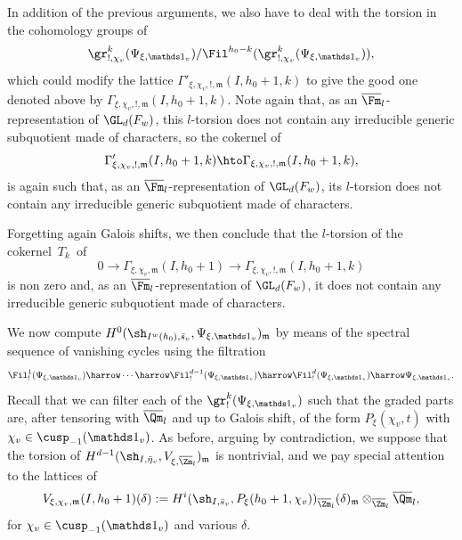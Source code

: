 In addition of the previous arguments, we also have to deal with the
torsion in the cohomology groups of
\[
\gr^{k}_{!,\chi_v}(\Psi_{\xi,\mathds 1_v}) /\Fil^{h_0-k}(\gr^{k}_{!,\chi_v}
(\Psi_{\xi,\mathds 1_v})),
\]
which could modify the lattice $\Gamma'_{\xi,\chi_v,!,\mathfrak m}
(I,h_0+1,k)$ to give the good one denoted above by
$\Gamma_{\xi,\chi_v,!,\mathfrak m}(I,h_0+1,k)$. Note
again that,
as an $\overline \Fm_l$-representation of $\GL_d(F_w)$, this $l$-torsion
does not contain any
irreducible generic subquotient made of characters, so the cokernel of
\[
\Gamma'_{\xi,\chi_v,!,\mathfrak m} (I,h_0+1,k)
\hto \Gamma_{\xi,\chi_v,!,\mathfrak m}(I,h_0+1,k),
\]
is again such that, as an $\overline \Fm_l$-representation of
$\GL_d(F_w)$, its $l$-torsion does not contain any irreducible generic
subquotient made of characters.

Forgetting again Galois shifts, we then conclude that the $l$-torsion of
the cokernel~$T_k$~of
\begin{equation} \label{eq-absurd}
0 \to \Gamma_{\xi,\chi_v,\mathfrak m}(I,h_0+1)
\to \Gamma_{\xi,\chi_v,!,\mathfrak m}
(I,h_0+1,k)
\end{equation}
is non zero and,
as an $\overline \Fm_l$-representation of $\GL_d(F_w)$, it
does not contain any
irreducible generic subquotient made of characters.

\medskip

We now compute $H^{0}(\sh_{I^w(h_0),\bar s_v},\Psi_{\xi,\mathds 1_v}
)_{\mathfrak m}$ by means of the spectral
sequence of vanishing cycles using the filtration
\[
\Fil^{1}_!(\Psi_{\xi,\mathds 1_v}) \harrow \cdots \harrow \Fil^{d-1}_!
(\Psi_{\xi,\mathds 1_v}) \harrow
\Fil^{d}_!(\Psi_{\xi,\mathds 1_v}) \harrow \Psi_{\xi,\mathds 1_v}.
\]
Recall that we can filter each of the
$\gr^k_!(\Psi_{\xi,\mathds 1_v})$
such that the graded parts are, after tensoring with $\overline \Qm_l$ and up to
Galois shift, of the form $P_\xi(\chi_v,t)$ with $\chi_v \in \cusp_{-1}(\mathds 1_v)$.
As before, arguing by contradiction,
we suppose that the torsion of
$H^{d-1}(\sh_{I,\bar \eta_v},V_{\xi,\overline \Zm_l})_{\mathfrak m}$
is nontrivial, and we pay special attention to the lattices of
\begin{equation} \label{eq-def-Vrho}
V_{\xi,\chi_v,\mathfrak m}(I,h_0+1)(\delta):=
H^i(\sh_{I,\bar s_v},P_\xi(h_0+1,\chi_v))_{\overline \Zm_l}(\delta)_{\mathfrak m}
\otimes_{\overline \Zm_l} \overline \Qm_l,
\end{equation}
for $\chi_v \in \cusp_{-1}(\mathds 1_v)$ and various $\delta$.

